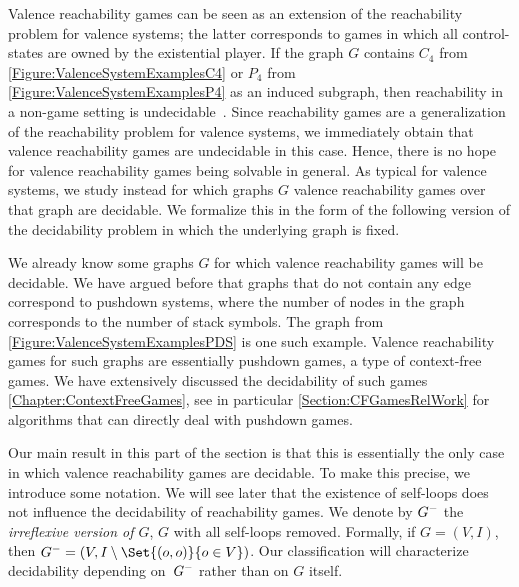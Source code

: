 \documentclass[../../diss.tex]{subfiles}
\begin{document}
Valence reachability games can be seen as an extension of the reachability problem for valence systems; the latter corresponds to games in which all control-states are owned by the existential player.
If the graph $G$ contains $C_4$ from \cref{Figure:ValenceSystemExamplesC4} or $P_4$ from \cref{Figure:ValenceSystemExamplesP4} as an induced subgraph, then reachability in a non-game setting is undecidable~\cite{Zetzsche21}.
Since reachability games are a generalization of the reachability problem for valence systems, we immediately obtain that valence reachability games are undecidable in this case.
Hence, there is no hope for valence reachability games being solvable in general.
As typical for valence systems, we study instead for which graphs $G$ valence reachability games over that graph are decidable.
We formalize this in the form of the following version of the decidability problem in which the underlying graph is fixed.

\begin{problem}
\end{problem}

We already know some graphs $G$ for which valence reachability games will be decidable.
We have argued before that graphs that do not contain any edge correspond to pushdown systems, where the number of nodes in the graph corresponds to the number of stack symbols.
The graph from \cref{Figure:ValenceSystemExamplesPDS} is one such example.
Valence reachability games for such graphs are essentially pushdown games, a type of context-free games.
We have extensively discussed the decidability of such games \cref{Chapter:ContextFreeGames}, see in particular \cref{Section:CFGamesRelWork} for algorithms that can directly deal with pushdown games.

Our main result in this part of the section is that this is essentially the only case in which valence reachability games are decidable.
To make this precise, we introduce some notation.
We will see later that the existence of self-loops does not influence the decidability of reachability games.
We denote by ${G}^{-}$ the \emph{irreflexive version of $G$}, $G$ with all self-loops removed.
Formally, if $G = (V,I)$, then $\irreflexive{G} = (V, I \setminus \Set{ (o,o)}{o \in V})$.
Our classification will characterize decidability depending on~${G}^{-}$ rather than on $G$ itself.
\end{document}
